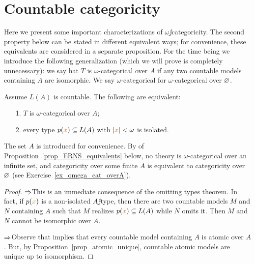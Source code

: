 \documentclass[creche.tex]{subfiles}
\begin{document}
\section{Countable categoricity}

Here we present some important characterizations of $\omega\jj$categoricity.
The second property below can be stated in different equivalent ways; for convenience, these equivalents are considered in a separate proposition.
For the time being we introduce the following generalization (which we will prove is completely unnecessary): we say hat $T$ is $\omega$-categorical over $A$ if any two countable models containing $A$ are isomorphic.
We say $\omega$-categorical for $\omega$-categorical over $\varnothing$.

\begin{theorem} Assume $L(A)$ is countable.
The following are equivalent:
\begin{itemize}   
\item[1.] $T$ is $\omega$-categorical over $A$;
\item[2.] every type $p({\color{brown} x})\subseteq L(A)$ with $|{\color{brown} x}|<\omega$ is isolated.

\end{itemize}
\end{theorem}
The set $A$ is introduced for convenience.
By  of Proposition~\ref{prop_ERNS_equivalents} below, no theory is $\omega$-categorical over an infinite set, and categoricity over some finite $A$ is equivalent to categoricity over $\varnothing$ (see Exercise~\ref{ex_omega_cat_overA}).

\begin{proof} $\Rightarrow$\quad This is an immediate consequence of the omitting types theorem. In fact, if $p({\color{brown} x})$ is a non-isolated $A\jj$type, then there are two countable models $M$ and $N$ containing $A$ such that $M$ realizes $p({\color{brown} x})\subseteq L(A)$ while $N$ omits it.
Then $M$ and $N$ cannot be isomorphic over $A$.

$\Rightarrow$\quad Observe that  implies that every countable model containing $A$ is atomic over $A$.
But, by Proposition~\ref{prop_atomic_unique}, countable atomic models are unique up to isomorphism.
\end{proof}
\end{document}
